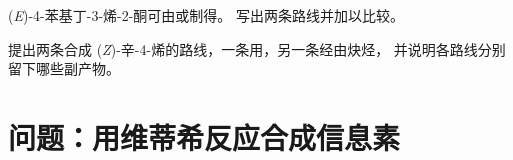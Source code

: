 \begin{exercise}[$\star\star\star$]\label{exo:b2:wittig:11}
(\textit{E})-4-苯基丁-3-烯-2-酮可由或制得。
写出两条路线并加以比较。
\end{exercise}

\begin{exercise}[$\star\star\star$]\label{exo:b2:wittig:12}
提出两条合成 (\textit{Z})-辛-4-烯的路线，一条用，另一条经由炔烃，
并说明各路线分别留下哪些副产物。
\end{exercise}

\section{问题：用维蒂希反应合成信息素}


